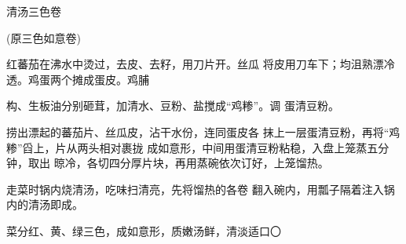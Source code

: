 \begin{recipe}{清汤三色卷}

(原三色如意卷)

\ingredients


\cooking

\step 红蕃茄在沸水中烫过，去皮、去籽，用刀片开。丝瓜 将皮用刀车下；均沮熟漂冷透。鸡蛋两个摊成蛋皮。鸡脯

构、生板油分别砸茸，加清水、豆粉、盐搅成“鸡糁”。调 蛋清豆粉。

\step 捞出漂起的蕃茄片、丝瓜皮，沾干水份，连同蛋皮各 抹上一层蛋清豆粉，再将“鸡糁”舀上，片从两头相对裹拢 成如意形，中间用蛋清豆粉粘稳，入盘上笼蒸五分钟，取出 晾冷，各切四分厚片块，再用蒸碗依次订好，上笼馏热。

\step 走菜时锅内烧清汤，吃味扫清亮，先将馏热的各卷 翻入碗内，用瓢子隔着注入锅内的清汤即成。

\notes

菜分红、黄、绿三色，成如意形，质嫩汤鲜，清淡适口〇

\end{recipe}

